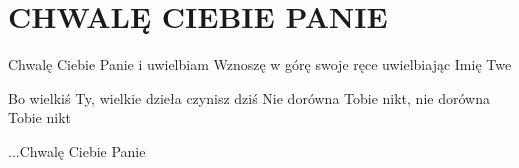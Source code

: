 \documentclass[../../../songbook.tex]{subfiles}
\begin{document}
\TabPositions{8cm} %
\section*{CHWALĘ CIEBIE PANIE}
{}
\vspace{0.5cm}

Chwalę Ciebie Panie i uwielbiam				 \newline
Wznoszę w górę swoje ręce uwielbiając Imię Twe		 \newline

\-\hspace{0.1cm} Bo wielkiś Ty, wielkie dzieła czynisz dziś		 \newline
\-\hspace{0.1cm} Nie dorówna Tobie nikt, nie dorówna Tobie nikt	 \newline

...Chwalę Ciebie Panie		 \newline
\end{document}
